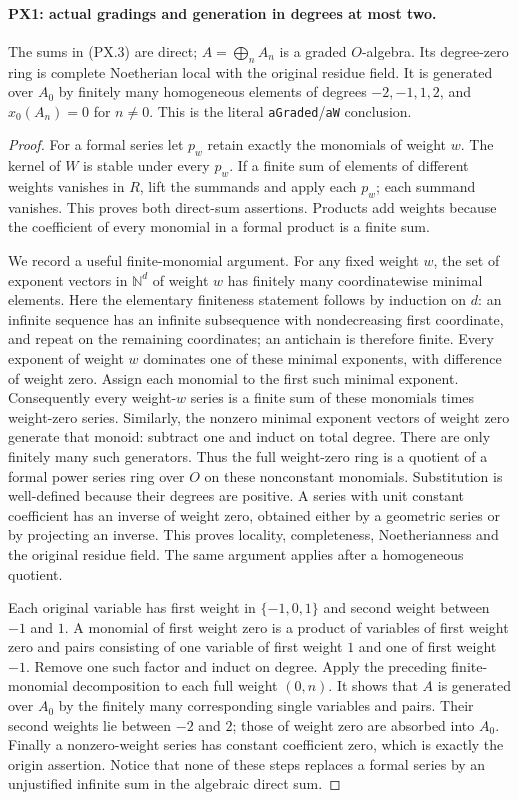 \paragraph{PX1: actual gradings and generation in degrees at most two.}
\label{claim:PX1}
The sums in (PX.3) are direct; $A=\bigoplus_nA_n$ is a
graded $O$-algebra.  Its degree-zero ring is complete
Noetherian local with the original residue field.  It is
generated over $A_0$ by finitely many homogeneous elements
of degrees $-2,-1,1,2$, and $x_0(A_n)=0$ for $n\ne0$.
This is the literal \texttt{aGraded}/\texttt{aW} conclusion.

\begin{proof}
For a formal series let $p_w$ retain exactly the monomials
of weight $w$.  The kernel of $W$ is stable under every
$p_w$.  If a finite sum of elements of different weights
vanishes in $R$, lift the summands and apply each $p_w$;
each summand vanishes.  This proves both direct-sum assertions.
Products add weights because the coefficient of every monomial
in a formal product is a finite sum.

We record a useful finite-monomial argument.  For any fixed
weight $w$, the set of exponent vectors in $\mathbb N^d$ of
weight $w$ has finitely many coordinatewise minimal elements.
Here the elementary finiteness statement follows by induction
on $d$: an infinite sequence has an infinite subsequence with
nondecreasing first coordinate, and repeat on the remaining
coordinates; an antichain is therefore finite.  Every exponent
of weight $w$ dominates one of these minimal exponents, with
difference of weight zero.  Assign each monomial to the first
such minimal exponent.  Consequently every weight-$w$ series
is a finite sum of these monomials times weight-zero series.
Similarly, the nonzero minimal exponent vectors of weight zero
generate that monoid: subtract one and induct on total degree.
There are only finitely many such generators.  Thus the full
weight-zero ring is a quotient of a formal power series ring
over $O$ on these nonconstant monomials.  Substitution is
well-defined because their degrees are positive.  A series
with unit constant coefficient has an inverse of weight zero,
obtained either by a geometric series or by projecting an
inverse.  This proves locality, completeness, Noetherianness
and the original residue field.  The same argument applies
after a homogeneous quotient.

Each original variable has first weight in $\{-1,0,1\}$
and second weight between $-1$ and $1$.  A monomial of first
weight zero is a product of variables of first weight zero
and pairs consisting of one variable of first weight $1$
and one of first weight $-1$.  Remove one such factor and
induct on degree.  Apply the preceding finite-monomial
decomposition to each full weight $(0,n)$.  It shows that
$A$ is generated over $A_0$ by the finitely many corresponding
single variables and pairs.  Their second weights lie between
$-2$ and $2$; those of weight zero are absorbed into $A_0$.
Finally a nonzero-weight series has constant coefficient zero,
which is exactly the origin assertion.  Notice that none of
these steps replaces a formal series by an unjustified
infinite sum in the algebraic direct sum.
\end{proof}


